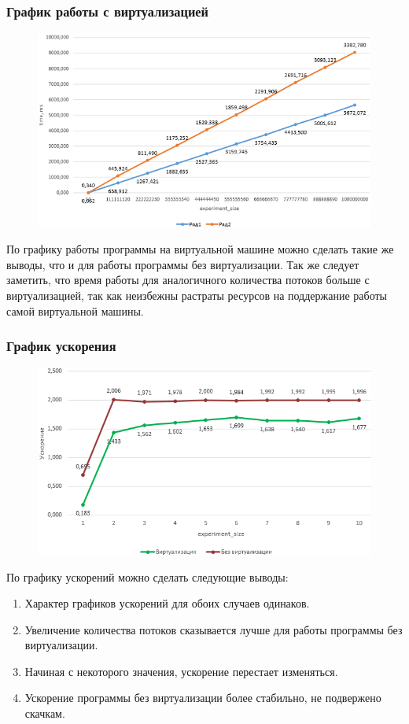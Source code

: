 \documentclass{article}
\begin{document}
		\subsubsection{График работы с виртуализацией}
		\begin{figure}[h]
			\includegraphics{withVirt.png}			
			\label{ris:with}
		\end{figure}
		По графику работы программы на виртуальной машине можно сделать такие же выводы, что и для работы программы без виртуализации. Так же следует заметить, что время работы для аналогичного количества потоков больше с виртуализацией, так как неизбежны растраты ресурсов на поддержание работы самой виртуальной машины.
\newpage
		\subsubsection{График ускорения}
		\begin{figure}[h]
			\includegraphics{acceleration.png}
			\label{ris:accel}
		\end{figure}
		По графику ускорений можно сделать следующие выводы:\\
		\begin{enumerate}
			\item Характер графиков ускорений для обоих случаев одинаков.
			\item Увеличение количества потоков сказывается лучше для работы программы без виртуализации.
			\item Начиная с некоторого значения, ускорение перестает изменяться.
			\item Ускорение программы без виртуализации более стабильно, не подвержено скачкам.
		\end{enumerate}
\newpage
\end{document}
